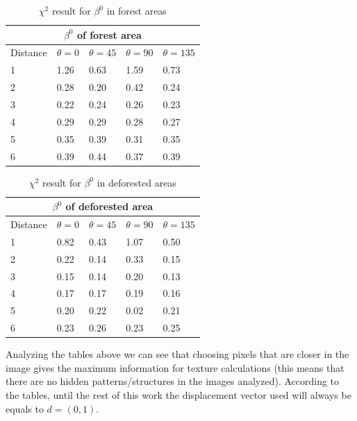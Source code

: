 \begin{table}[H]
    \begin{tabular}{ |p{2.5cm}||p{2.5cm}|p{2.5cm}|p{2.5cm}|p{2.5cm}| }
     \hline
     \multicolumn{5}{|c|}{$\beta^0$ of forest area} \\
     \hline
     Distance& $\theta=0$ & $\theta=45$ & $\theta=90$ & $\theta=135$\\
     \hline
        1 &1.26 &0.63 &1.59 &0.73\\
        2 &0.28 &0.20 &0.42 &0.24\\
        3 &0.22 &0.24 &0.26 &0.23\\
        4 &0.29 &0.29 &0.28 &0.27\\
        5 &0.35 &0.39 &0.31 &0.35\\
        6 &0.39 &0.44 &0.37 &0.39\\
     \hline
    \end{tabular}
     \caption{$\chi^2$ result for $\beta^0$ in forest areas}
    \label{table:4}
\end{table}

\begin{table}[H]
    \begin{tabular}{ |p{2.5cm}||p{2.5cm}|p{2.5cm}|p{2.5cm}|p{2.5cm}| }
     \hline
     \multicolumn{5}{|c|}{$\beta^0$ of deforested area} \\
     \hline
     Distance& $\theta=0$ & $\theta=45$ & $\theta=90$ & $\theta=135$\\
     \hline
        1 &0.82 &0.43 &1.07 &0.50\\
        2 &0.22 &0.14 &0.33 &0.15\\
        3 &0.15 &0.14 &0.20 &0.13\\
        4 &0.17 &0.17 &0.19 &0.16\\
        5 &0.20 &0.22 &0.02 &0.21\\
        6 &0.23 &0.26 &0.23 &0.25\\
     \hline
    \end{tabular}
     \caption{$\chi^2$ result for $\beta^0$ in deforested areas}
    \label{table:5}
\end{table}

Analyzing the tables above we can see that choosing pixels that are closer in the image gives the maximum information for texture calculations (this means that there are no hidden patterns/structures in the images analyzed). According to the tables, until the rest of this work the displacement vector used will always be equals to $d=(0, 1)$.



